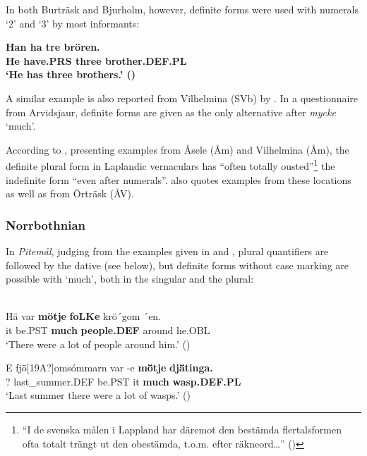 \z

In both Burträsk and Bjurholm, however, definite forms were used with numerals ‘2’ and ‘3’ by most informants:

\ea \label{} 
\gll \bfseries Han  ha  tre  brören.\\
\bfseries He  have.PRS  three  brother.DEF.PL\\
\glt ‘He has three brothers.’ (\citet[24]{BergholmEtAl1999})

\z

A similar example is also reported from Vilhelmina (SVb) by \citet{WälchliEtAl1998}. In a questionnaire from Arvidsjaur, definite forms are given as the only alternative after \textit{mycke} ‘much’. 

According to \citet[282]{ÅgrenEtAl1954}, presenting examples from Åsele (Åm) and Vilhelmina (Åm), the definite plural form in Laplandic vernaculars has “often totally ousted”\footnote{ “I de svenska målen i Lappland har däremot den bestämda flertalsformen ofta totalt trängt ut den obestämda, t.o.m. efter räkneord…” (\citet[282]{ÅgrenEtAl1954})} the indefinite form “even after numerals”.  \citet[17]{Delsing2003a} also quotes examples from these locations as well as from Örträsk (ÅV). 

\subsubsection{Norrbothnian}
 In \textit{Pitemål}, judging from the examples given in \citet{Brännström1993} and \citet{LidströmEtAl1991}, plural quantifiers are followed by the dative (see below), but definite forms without case marking are possible with  ‘much’, both in the singular and the plural:

\ea\label{}
\\
\gll Hä  var  \textbf{mö{\textasciigrave}tje} \textbf{  foLKe} krö´gom  ´en.\\
it  be.PST  \textbf{much} \textbf{people.DEF} around  he.OBL\\
\glt ‘There were a lot of people around him.’ (\citet[52]{Brännström1993})

\z

\ea
\gll E  fj\={ö}[19A?]omsómmarn  var  {}-e  \textbf{m\={ö}tje} \textbf{  dj\={ä}tinga.}\\
?  last\_summer.DEF  be.PST  it  \textbf{much} \textbf{wasp.DEF.PL}\\
\glt ‘Last summer there were a lot of wasps.’ (\citet[93]{BerglundEtAl1991})

